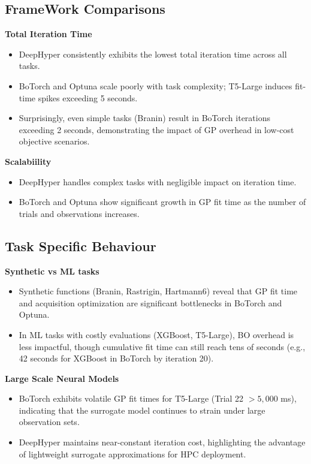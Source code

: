 \documentclass[11pt]{article}
\begin{document}
\subsection{FrameWork Comparisons}
\textbf{Total Iteration Time}
\begin{itemize}
    \item DeepHyper consistently exhibits the lowest total iteration time across all tasks.
    \item BoTorch and Optuna scale poorly with task complexity; T5-Large induces fit-time spikes exceeding 5 seconds.
    \item Surprisingly, even simple tasks (Branin) result in BoTorch iterations exceeding 2 seconds, demonstrating the impact of GP overhead in low-cost objective scenarios.
\end{itemize}

\textbf{Scalabiility}
\begin{itemize}
    \item DeepHyper handles complex tasks with negligible impact on iteration time.
    \item BoTorch and Optuna show significant growth in GP fit time as the number of trials and observations increases.
\end{itemize}

\subsection{Task Specific Behaviour}

\textbf{Synthetic vs ML tasks}
\begin{itemize}
    \item Synthetic functions (Branin, Rastrigin, Hartmann6) reveal that GP fit time and acquisition optimization are significant bottlenecks in BoTorch and Optuna.
    \item In ML tasks with costly evaluations (XGBoost, T5-Large), BO overhead is less impactful, though cumulative fit time can still reach tens of seconds (e.g., 42 seconds for XGBoost in BoTorch by iteration 20).
\end{itemize}

\textbf{Large Scale Neural Models}
\begin{itemize}
    \item BoTorch exhibits volatile GP fit times for T5-Large (Trial 22 $> 5,000$ ms), indicating that the surrogate model continues to strain under large observation sets.
    \item DeepHyper maintains near-constant iteration cost, highlighting the advantage of lightweight surrogate approximations for HPC deployment.
\end{itemize}
\end{document}

